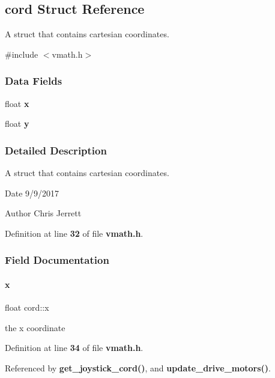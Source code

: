 \subsection{cord Struct Reference}
\label{structcord}


A struct that contains cartesian coordinates.  




{\ttfamily \#include $<$vmath.\+h$>$}

\subsubsection*{Data Fields}
\begin{DoxyCompactItemize}
\item 
float \textbf{ x}
\item 
float \textbf{ y}
\end{DoxyCompactItemize}


\subsubsection{Detailed Description}
A struct that contains cartesian coordinates. 

\begin{DoxyDate}{Date}
9/9/2017 
\end{DoxyDate}
\begin{DoxyAuthor}{Author}
Chris Jerrett 
\end{DoxyAuthor}


Definition at line \textbf{ 32} of file \textbf{ vmath.\+h}.



\subsubsection{Field Documentation}
\mbox{\label{structcord_a2eef9b681474b679cf87b0c20eced2cd}} 
\paragraph{x}
{\footnotesize\ttfamily float cord\+::x}

the x coordinate 

Definition at line \textbf{ 34} of file \textbf{ vmath.\+h}.



Referenced by \textbf{ get\+\_\+joystick\+\_\+cord()}, and \textbf{ update\+\_\+drive\+\_\+motors()}.

